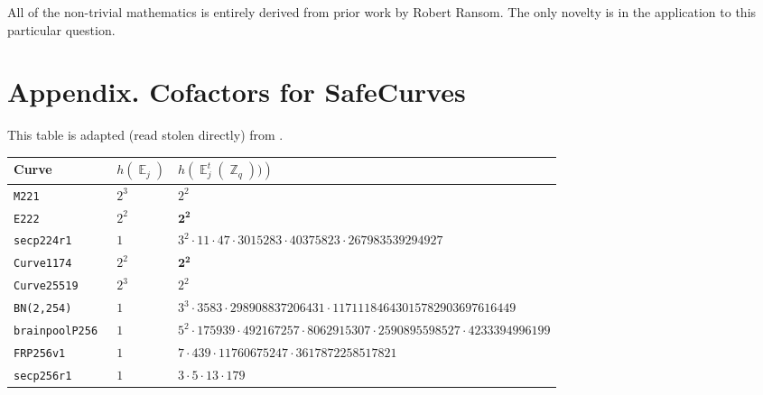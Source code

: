 \documentclass[11pt,fleqn]{article}
\newcommand{\Ejt}{\ensuremath{\BbbE^t_j(\BbbZ_q))} }
\newcommand{\Ej}{\ensuremath{\BbbE_j} }
\begin{document}
All of the non-trivial mathematics is entirely derived from prior work by
Robert Ransom. The only novelty is in the application to this particular
question.

\section*{Appendix. Cofactors for SafeCurves}

This table is adapted (read stolen directly) from \cite{safecurves}.


%
\begin{tabularx}{\textwidth}{llR}
\textbf{Curve}            &$h(\Ej)$ & $h(\Ejt)$ \\
\hline
\texttt{\footnotesize M221         }& $\scriptstyle 2^3$    & $\scriptstyle 2^2                                                                  $\\
\texttt{\footnotesize E222         }& $\scriptstyle 2^2$    & $\scriptstyle \mathbf{2^2}                                                                  $\\
\texttt{\footnotesize secp224r1     }& $\scriptstyle 1  $    & $\scriptstyle 3^2 \cdot 11 \cdot 47 \cdot 3015283 \cdot 40375823 \cdot 267983539294927                 $\\
\texttt{\footnotesize Curve1174     }& $\scriptstyle 2^2$    & $\scriptstyle \mathbf{2^2}                                                                  $\\
\texttt{\footnotesize Curve25519    }& $\scriptstyle 2^3$    & $\scriptstyle 2^2                                                                  $\\
\texttt{\footnotesize BN(2,254)     }& $\scriptstyle 1  $    & $\scriptstyle 3^3 \cdot 3583 \cdot 298908837206431 \cdot 11711184643015782903697616449         $\\
\texttt{\footnotesize brainpoolP256 }& $\scriptstyle 1  $    & $\scriptstyle 5^2 \cdot 175939 \cdot 492167257 \cdot 8062915307 \cdot 2590895598527 \cdot 4233394996199$\\
\texttt{\footnotesize FRP256v1      }& $\scriptstyle 1  $    & $\scriptstyle 7 \cdot 439 \cdot 11760675247 \cdot 3617872258517821                             $\\
\texttt{\footnotesize secp256r1     }& $\scriptstyle 1  $    & $\scriptstyle 3 \cdot 5 \cdot 13 \cdot 179                                                     $\\

\end{tabularx}
\end{document}
